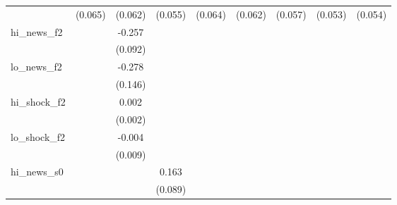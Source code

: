 {\begin{tabular}{l*{8}{c}}
            &     (0.065)         &     (0.062)         &     (0.055)         &     (0.064)         &     (0.062)         &     (0.057)         &     (0.053)         &     (0.054)         \\
\addlinespace
hi\_news\_f2  &                     &      -0.257\sym{***}&                     &                     &                     &                     &                     &                     \\
            &                     &     (0.092)         &                     &                     &                     &                     &                     &                     \\
\addlinespace
lo\_news\_f2  &                     &      -0.278\sym{*}  &                     &                     &                     &                     &                     &                     \\
            &                     &     (0.146)         &                     &                     &                     &                     &                     &                     \\
\addlinespace
hi\_shock\_f2 &                     &       0.002         &                     &                     &                     &                     &                     &                     \\
            &                     &     (0.002)         &                     &                     &                     &                     &                     &                     \\
\addlinespace
lo\_shock\_f2 &                     &      -0.004         &                     &                     &                     &                     &                     &                     \\
            &                     &     (0.009)         &                     &                     &                     &                     &                     &                     \\
\addlinespace
hi\_news\_s0  &                     &                     &       0.163\sym{*}  &                     &                     &                     &                     &                     \\
            &                     &                     &     (0.089)         &                     &                     &                     &                     &                     \\

\end{tabular}}
